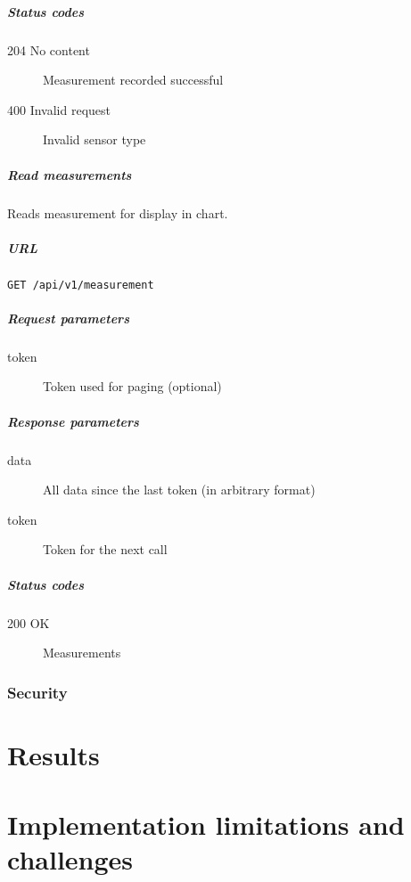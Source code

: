 \documentclass[a4paper,11pt]{scrartcl}
\begin{document}
\subsubsection*{Status codes}
\begin{description}
\item[204 No content] Measurement recorded successful
\item[400 Invalid request] Invalid sensor type
\end{description}

\subsubsection{Read measurements}
Reads measurement for display in chart.

\subsubsection*{URL}
\texttt{GET /api/v1/measurement}

\subsubsection*{Request parameters}
\begin{description}
\item[token] Token used for paging (optional)
\end{description}

\subsubsection*{Response parameters}
\begin{description}
\item[data] All data since the last token (in arbitrary format)
\item[token] Token for the next call
\end{description}

\subsubsection*{Status codes}
\begin{description}
\item[200 OK] Measurements
\end{description}

\section{Security}

\part{Results}

\part{Implementation limitations and challenges}
\end{document}
